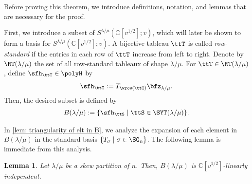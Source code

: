 \documentclass[12pt, reqno]{amsart}
\theoremstyle{plain}
\newtheorem{lemma}[lemma]{Lemma}
\theoremstyle{definition}
\numberwithin{equation}{section}
\numberwithin{figure}{section}
\numberwithin{table}{section}
\def\C{\mathbb C}
\begin{document}
Before proving this theorem, we  introduce definitions, notation, and lemmas that are necessary for the proof.



First, we introduce a subset of $S^{\lambda/\mu}(\C[v^{1/2}];v)$, which will later be shown to form a basis for $S^{\lambda/\mu}(\C[v^{1/2}];v)$.
A bijective tableau $\ttT$ is called \emph{row-standard} if the entries in each row of $\ttT$ increase from left to right.
Denote by $\RT(\lambda/\mu)$ the set of all row-standard  tableaux of shape $\lambda/\mu$.
For $\ttT \in \RT(\lambda/\mu)$, define 
$\sfh_{\ttT} \in \polyH$  by
\[
\sfh_{\ttT} := T_{\wrow(\ttT)} \bfz_{\lambda/\mu}.
\]
Then, the desired subset is defined by 
\[
B(\lambda/\mu) := \{\sfh_{\ttS} \mid \ttS \in \SYT(\lambda/\mu) \}.
\]

In \cref{lem: triangularity of elt in  B}, we analyze the expansion of each element in $B(\lambda/\mu)$ in the standard basis $\{T_\sigma \mid \sigma \in \SG_n\}$.
The following lemma is immediate from this analysis.


\begin{lemma}\label{lem: lin indep of B(lam/mu)}
Let $\lambda/\mu$ be a skew partition of $n$.
Then, $B(\lambda/\mu)$ is $\C[v^{1/2}]$-linearly independent.
\end{lemma}
\end{document}
